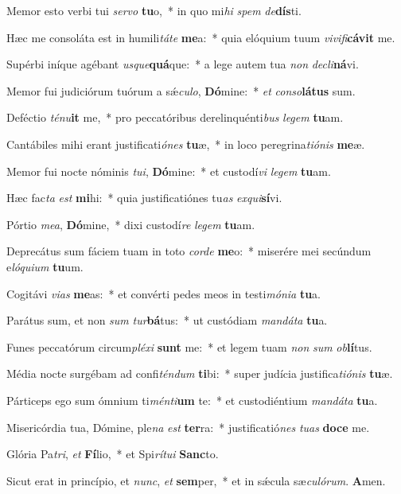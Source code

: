 ﻿\item Memor esto verbi tui \emph{ser}\emph{vo} \textbf{tu}o,~* in quo mi\emph{hi} \emph{spem} \emph{de}\textbf{dís}ti.
\item Hæc me consoláta est in humili\emph{tá}\emph{te} \textbf{me}a:~* quia elóquium tuum \emph{vi}\emph{vi}\emph{fi}\textbf{cá}\textbf{vit} me.
\item Supérbi iníque agébant \emph{us}\emph{que}\textbf{quá}que:~* a lege autem tua \emph{non} \emph{de}\emph{cli}\textbf{ná}vi.
\item Memor fui judiciórum tuórum a sǽ\emph{cu}\emph{lo}, \textbf{Dó}mine:~* \emph{et} \emph{con}\emph{so}\textbf{lá}\textbf{tus} sum.
\item Deféctio \emph{té}\emph{nu}\textbf{it} me,~* pro peccatóribus derelinquénti\emph{bus} \emph{le}\emph{gem} \textbf{tu}am.
\item Cantábiles mihi erant justificati\emph{ó}\emph{nes} \textbf{tu}æ,~* in loco peregrina\emph{ti}\emph{ó}\emph{nis} \textbf{me}æ.
\item Memor fui nocte nóminis \emph{tu}\emph{i}, \textbf{Dó}mine:~* et custodí\emph{vi} \emph{le}\emph{gem} \textbf{tu}am.
\item Hæc fac\emph{ta} \emph{est} \textbf{mi}hi:~* quia justificatiónes tu\emph{as} \emph{ex}\emph{qui}\textbf{sí}vi.
\item Pórtio \emph{me}\emph{a}, \textbf{Dó}mine,~* dixi custodí\emph{re} \emph{le}\emph{gem} \textbf{tu}am.
\item Deprecátus sum fáciem tuam in toto \emph{cor}\emph{de} \textbf{me}o:~* miserére mei secúndum e\emph{ló}\emph{qui}\emph{um} \textbf{tu}um.
\item Cogitávi \emph{vi}\emph{as} \textbf{me}as:~* et convérti pedes meos in testi\emph{mó}\emph{ni}\emph{a} \textbf{tu}a.
\item Parátus sum, et non \emph{sum} \emph{tur}\textbf{bá}tus:~* ut custódiam \emph{man}\emph{dá}\emph{ta} \textbf{tu}a.
\item Funes peccatórum circum\emph{plé}\emph{xi} \textbf{sunt} me:~* et legem tuam \emph{non} \emph{sum} \emph{ob}\textbf{lí}tus.
\item Média nocte surgébam ad confi\emph{tén}\emph{dum} \textbf{ti}bi:~* super judícia justifica\emph{ti}\emph{ó}\emph{nis} \textbf{tu}æ.
\item Párticeps ego sum ómnium ti\emph{mén}\emph{ti}\textbf{um} te:~* et custodiéntium \emph{man}\emph{dá}\emph{ta} \textbf{tu}a.
\item Misericórdia tua, Dómine, ple\emph{na} \emph{est} \textbf{ter}ra:~* justificatió\emph{nes} \emph{tu}\emph{as} \textbf{do}\textbf{ce} me.
\item Glória Pa\emph{tri}, \emph{et} \textbf{Fí}lio,~* et Spi\emph{rí}\emph{tu}\emph{i} \textbf{Sanc}to.
\item Sicut erat in princípio, et \emph{nunc}, \emph{et} \textbf{sem}per,~* et in sǽcula sæ\emph{cu}\emph{ló}\emph{rum}. \textbf{A}men.
